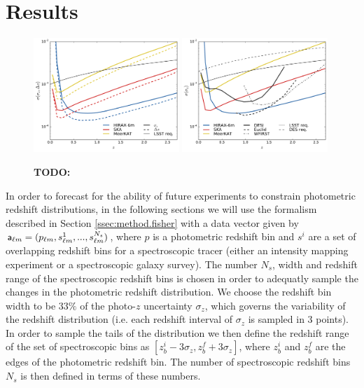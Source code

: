 \documentclass[prd,twocolumn]{revtex4}
\newcommand{\TODO}[1]{{\bf TODO:} \textcolor{red}{#1}}
\begin{document}
\section{Results} \label{sec:results}
    \begin{figure}
      \centering
      \includegraphics[width=0.49\textwidth]{compare_wbias}
      \includegraphics[width=0.49\textwidth]{compare_spec}
      \caption{\TODO{}}
      \label{fig:compare_spec}
    \end{figure}
  In order to forecast for the ability of future experiments to constrain photometric
  redshift distributions, in the following sections we will use the formalism 
  described in Section \ref{ssec:method.fisher} with a data vector given by
  ${\sf a}_{\ell m}=(p_{\ell m},s^1_{\ell m},...,s^{N_s}_{\ell m})$, where $p$ is
  a photometric redshift bin and $s^i$ are a set of overlapping redshift bins for
  a spectroscopic tracer (either an intensity mapping experiment or a spectroscopic
  galaxy survey). The number $N_s$, width and redshift range of the spectroscopic
  redshift bins is chosen in order to adequatly sample the changes in the photometric
  redshift distribution. We choose the redshift bin width to be $33\%$ of the
  photo-$z$ uncertainty $\sigma_z$, which governs the variability of the redshift
  distribution (i.e. each redshift interval of $\sigma_z$ is sampled in 3 points).
  In order to sample the tails of the distribution we then define the redshift 
  range of the set of spectroscopic bins as $[z_b^i-3\sigma_z,z_b^f+3\sigma_z]$,
  where $z_b^i$ and $z_b^f$ are the edges of the photometric redshift bin. The
  number of spectroscopic redshift bins $N_s$ is then defined in terms of these
  numbers.
  
\end{document}
